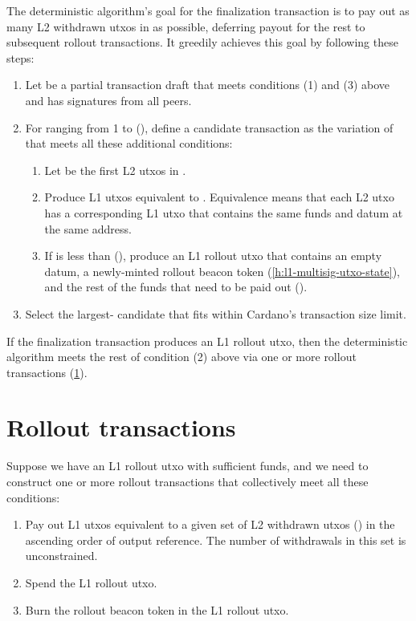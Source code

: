 \documentclass[../hydrozoa.tex]{subfiles}
\begin{document}
The deterministic algorithm's goal for the finalization transaction is to pay out as many L2 withdrawn utxos in  as possible, deferring payout for the rest to subsequent rollout transactions.
It greedily achieves this goal by following these steps:
\begin{enumerate}
  \item Let  be a partial transaction draft that meets conditions (1) and (3) above and has signatures from all peers.
  \item For  ranging from 1 to (), define a candidate transaction as the variation of  that meets all these additional conditions:
    \begin{enumerate}
      \item Let  be the first  L2 utxos in .
      \item Produce L1 utxos equivalent to .
        Equivalence means that each L2 utxo has a corresponding L1 utxo that contains the same funds and datum at the same address.
      \item If  is less than (), produce an L1 rollout utxo that contains an empty datum, a newly-minted rollout beacon token (\cref{h:l1-multisig-utxo-state}), and the rest of the funds that need to be paid out
        ().
    \end{enumerate}
  \item Select the largest- candidate that fits within Cardano's transaction size limit.
\end{enumerate}

If the finalization transaction produces an L1 rollout utxo, then the deterministic algorithm meets the rest of condition (2) above via one or more rollout transactions (\cref{h:deterministic-rollout-rollouts}).

\section{Rollout transactions}%
\label{h:deterministic-rollout-rollouts}%

Suppose we have an L1 rollout utxo with sufficient funds, and we need to construct one or more rollout transactions that collectively meet all these conditions:
\begin{enumerate}
  \item Pay out L1 utxos equivalent to a given set of L2 withdrawn utxos () in the ascending order of output reference.
    The number of withdrawals in this set is unconstrained.
  \item Spend the L1 rollout utxo.
  \item Burn the rollout beacon token in the L1 rollout utxo.
\end{enumerate}
\end{document}
